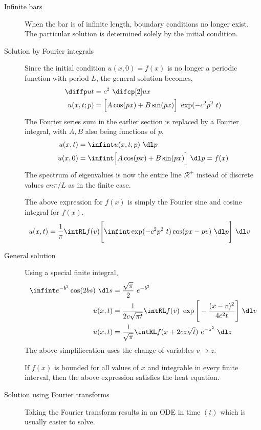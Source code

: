 \begin{description}
    \item[Infinite bars] When the bar is of infinite length, boundary conditions no
        longer exist. The particular solution is determined solely by the initial
        condition.

    \item[Solution by Fourier integrals] Since the initial condition $ u(x, 0) = f(x) $
        is no longer a periodic function with period $ L $, the general solution becomes,
        \begin{align}
            \diffp ut   & = c^2\ \difcp[2] ux                                   \\
            u(x, t ; p) & = \Big[ A\cos(px) + B\sin(px) \Big]\ \exp(-c^2p^2\ t) \\
        \end{align}
        The Fourier series sum in the earlier section is replaced by a Fourier integral,
        with $ A, B $ also being functions of $ p $,
        \begin{align}
            u(x, t) & = \infint u(x, t; p)\ \dl p                               \\
            u(x, 0) & = \infint \Big[ A\cos(px) + B\sin(px) \Big]\ \dl p = f(x)
        \end{align}
        The spectrum of eigenvalues is now the entire line $ \mathcal{R}^+ $ instead of
        discrete values $ cn\pi/L $ as in the finite case. \par
        The above expression for $ f(x) $ is simply the Fourier sine and cosine integral
        for $ f(x) $.
        \begin{align}
            u(x, t) & = \frac{1}{\pi} \intRL f(v) \Bigg[ \infint
                \exp(-c^2p^2\ t)\cos(px - pv)\ \dl p \Bigg]\ \dl v
        \end{align}

    \item[General solution] Using a special finite integral,
        \begin{align}
            \infint e^{-b^2} \cos(2bs)\ \dl s & = \frac{\sqrt{\pi}}{2}\ e^{-b^2} \\
            u(x, t)                           & = \frac{1}{2c \sqrt{\pi t}}
            \intRL f(v)\ \exp\Bigg[-\frac{(x-v)^2}{4c^2 t}\Bigg]\ \dl v          \\
            u(x, t)                           & = \frac{1}{\sqrt{\pi}} \intRL
            f(x + 2cz\sqrt{t})\ e^{-z^2}\ \dl z
        \end{align}
        The above simplificcation uses the change of variables $ v \to z $. \par
        If $ f(x) $ is bounded for all values of $ x $ and integrable in every finite
        interval, then the above expression satisfies the heat equation.

    \item[Solution using Fourier transforms] Taking the Fourier transform results
        in an ODE in time $ (t) $ which is usually easier to solve.
\end{description}

